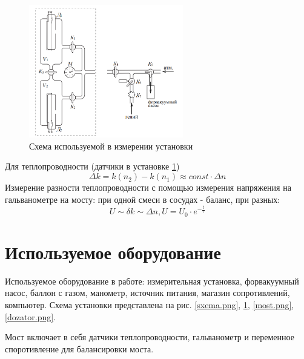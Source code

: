 \documentclass[a4paper,12pt]{article}
\begin{document}
\begin{figure}[h!]
\begin{center}
    \includegraphics[width=0.6\textwidth]{truba.png}
\end{center}
    \caption{Схема используемой в измерении установки} \label{truba.png}
\end{figure}

    Для теплопроводности (датчики в установке \ref{truba.png})
\begin{equation}
    \Delta k = k(n_2)-k(n_1)\approx const\cdot \Delta n
\end{equation}
    Измерение разности теплопроводности с помощью измерения напряжения на гальванометре на мосту: при одной смеси в сосудах - баланс, при разных:
\begin{equation}
    U\sim \delta k \sim \Delta n, U = U_0\cdot e^{-\frac{t}{\tau}}
\end{equation}
\section{Используемое оборудование}
    Используемое оборудование в работе:
    измерительная установка, форвакуумный насос, баллон с газом,  манометр, источник питания, магазин сопротивлений, компьютер.
    Схема установки представлена на рис. \ref{sxema.png}, \ref{truba.png}, \ref{most.png}, \ref{dozator.png}.

    Мост включает в себя датчики теплопроводности, гальванометр и переменное споротивление для балансировки моста.
\end{document}
